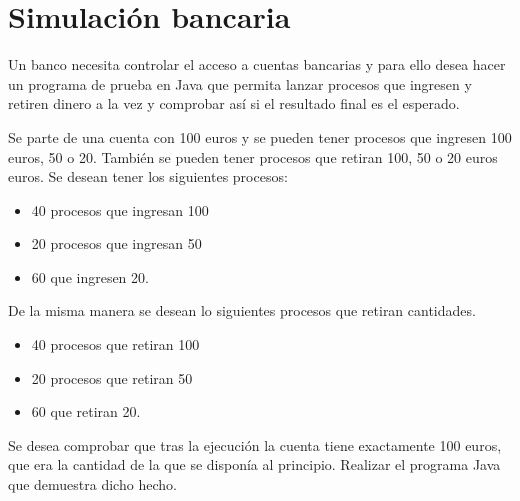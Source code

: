 \documentclass[letterpaper,10pt,spanish]{sphinxmanual}
\begin{document}
\begin{sphinxVerbatim}[commandchars=\\\{\}]
                    
                        \PYG{o}{[}\PYG{o}{]}
                 
\end{sphinxVerbatim}


\section{Simulación bancaria}
\label{\detokenize{textos/tema2:simulacion-bancaria}}
Un banco necesita controlar el acceso a cuentas bancarias y para ello desea hacer un programa de prueba en Java que permita lanzar procesos que ingresen y retiren dinero a la vez y comprobar así si el resultado final es el esperado.

Se parte de una cuenta con 100 euros y se pueden tener procesos que ingresen 100 euros, 50 o 20. También se pueden tener procesos que retiran 100, 50 o 20 euros euros. Se desean tener los siguientes procesos:
\begin{itemize}
\item {} 
40 procesos que ingresan 100

\item {} 
20 procesos que ingresan 50

\item {} 
60 que ingresen 20.

\end{itemize}

De la misma manera se desean lo siguientes procesos que retiran cantidades.
\begin{itemize}
\item {} 
40 procesos que retiran 100

\item {} 
20 procesos que retiran  50

\item {} 
60 que retiran 20.

\end{itemize}

Se desea comprobar que tras la ejecución la cuenta tiene exactamente 100 euros, que era la cantidad de la que se disponía al principio. Realizar el programa Java que demuestra dicho hecho.
\end{document}
